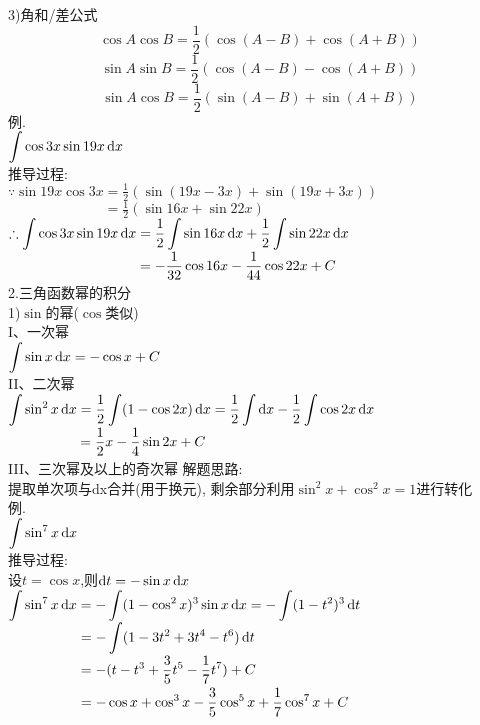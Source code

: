 3)角和/差公式\\
\[\cos A\cos B=\frac{1}{2}(\cos(A-B)+\cos(A+B))\]
\[\sin A\sin B=\frac{1}{2}(\cos(A-B)-\cos(A+B))\]
\[\sin A\cos B=\frac{1}{2}(\sin(A-B)+\sin(A+B))\]
例.\\
\phantom{例}$\displaystyle\int\cos3x\sin19x\mathop{}\!\mathrm{d} x$\\
推导过程:\\
$\displaystyle\because\sin19x\cos3x=\frac{1}{2}(\sin(19x-3x)+\sin(19x+3x))$\\
$\displaystyle\phantom{\because\sin19x\cos3x}=\frac{1}{2}(\sin16x+\sin22x)$\\
$\displaystyle\therefore\int\cos3x\sin19x\mathop{}\!\mathrm{d} x=\frac{1}{2}\int\sin16x\mathop{}\!\mathrm{d} x+\frac{1}{2}\int\sin22x\mathop{}\!\mathrm{d} x$\\
$\displaystyle\phantom{\therefore\int\cos3x\sin19x\dif x}=-\frac{1}{32}\cos16x-\frac{1}{44}\cos22x+C$\\[2ex]

2.三角函数幂的积分\\
1)$\sin$的幂($\cos$类似)\\
I、一次幂\\
$\displaystyle\int\sin x\mathop{}\!\mathrm{d} x=-\cos x+C$\\

II、二次幂\\
$\displaystyle\int\sin^2x\mathop{}\!\mathrm{d} x=\frac{1}{2}\int(1-\cos2x)\mathop{}\!\mathrm{d} x=\frac{1}{2}\int\mathop{}\!\mathrm{d} x-\frac{1}{2}\int\cos2x\mathop{}\!\mathrm{d} x$\\
$\displaystyle\phantom{\int\sin^2x\dif x}=\frac{1}{2}x-\frac{1}{4}\sin2x+C$\\

III、三次幂及以上的奇次幂
解题思路:\\
\phantom{解题}提取单次项与dx合并(用于换元), 剩余部分利用$\sin^2x+\cos^2x=1$进行转化\\
例.\\
\phantom{例}$\displaystyle\int\sin^7x\mathop{}\!\mathrm{d} x$\\
推导过程:\\
设$t=\cos x$,则$\mathop{}\!\mathrm{d} t=-\sin x\mathop{}\!\mathrm{d} x$\\
$\displaystyle\int\sin^7x\mathop{}\!\mathrm{d} x=-\int(1-\cos^2x)^3\sin x\mathop{}\!\mathrm{d} x=-\int(1-t^2)^3\mathop{}\!\mathrm{d} t$\\
$\displaystyle\phantom{\int\sin^7x\dif x}=-\int(1-3t^2+3t^4-t^6)\dif t$\\
$\displaystyle\phantom{\int\sin^7x\dif x}=-(t-t^3+\frac{3}{5}t^5-\frac{1}{7}t^7)+C$\\
$\displaystyle\phantom{\int\sin^7x\dif x}=-\cos x+\cos^3x-\frac{3}{5}\cos^5x+\frac{1}{7}\cos^7x+C$\\

